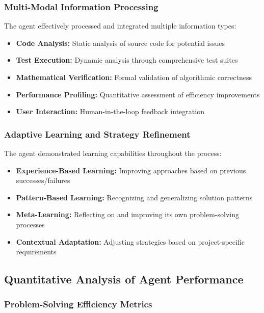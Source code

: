 \documentclass[12pt, a4paper]{article}
\begin{document}
\subsubsection{Multi-Modal Information Processing}

The agent effectively processed and integrated multiple information types:

\begin{itemize}
    \item \textbf{Code Analysis:} Static analysis of source code for potential issues
    \item \textbf{Test Execution:} Dynamic analysis through comprehensive test suites
    \item \textbf{Mathematical Verification:} Formal validation of algorithmic correctness
    \item \textbf{Performance Profiling:} Quantitative assessment of efficiency improvements
    \item \textbf{User Interaction:} Human-in-the-loop feedback integration
\end{itemize}

\subsubsection{Adaptive Learning and Strategy Refinement}

The agent demonstrated learning capabilities throughout the process:

\begin{itemize}
    \item \textbf{Experience-Based Learning:} Improving approaches based on previous successes/failures
    \item \textbf{Pattern-Based Learning:} Recognizing and generalizing solution patterns
    \item \textbf{Meta-Learning:} Reflecting on and improving its own problem-solving processes
    \item \textbf{Contextual Adaptation:} Adjusting strategies based on project-specific requirements
\end{itemize}

\subsection{Quantitative Analysis of Agent Performance}

\subsubsection{Problem-Solving Efficiency Metrics}
\end{document}
